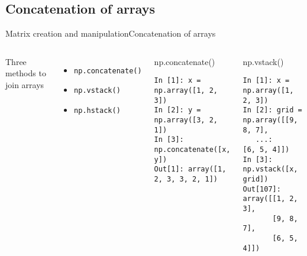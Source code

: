 \documentclass[10pt,compress]{beamer} %
\begin{document}
\subsection{Concatenation of arrays}
\begin{frame}[fragile]{Matrix creation and manipulation}{Concatenation of arrays}
	\begin{columns}
		Three methods to join arrays
		\begin{itemize}
			\item \texttt{np.concatenate()}
			\item \texttt{np.vstack()}
			\item \texttt{np.hstack()}
		\end{itemize}

		\begin{exampleblock}{\footnotesize{np.concatenate()}}
		\vspace{-0.2cm} 
			\begin{lstlisting}
In [1]: x = np.array([1, 2, 3])
In [2]: y = np.array([3, 2, 1])
In [3]: np.concatenate([x, y])
Out[1]: array([1, 2, 3, 3, 2, 1])
			\end{lstlisting}
		\vspace{-0.2cm} 
		\end{exampleblock}

		\begin{exampleblock}{\footnotesize{np.vstack()}}
		\vspace{-0.2cm} 
			\begin{lstlisting}
In [1]: x = np.array([1, 2, 3])
In [2]: grid = np.array([[9, 8, 7],
   ...:                  [6, 5, 4]])
In [3]: np.vstack([x, grid])
Out[107]: 
array([[1, 2, 3],
       [9, 8, 7],
       [6, 5, 4]])
			\end{lstlisting}
		\vspace{-0.2cm} 
		\end{exampleblock}
	\end{columns}
\end{frame}
\end{document}
